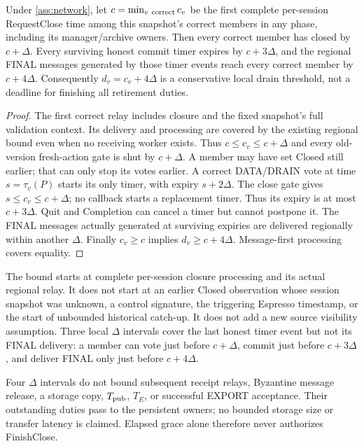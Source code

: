 \begin{proposition}
\label{prop:retirement-drain}
Under \cref{ass:network}, let $c=\min_{v\ {\rm correct}}c_v$ be the first
complete per-session RequestClose time among this snapshot's correct
members in any phase, including its manager/archive owners. Then every correct member has closed by $c+\Delta$.
Every surviving honest commit timer expires by $c+3\Delta$, and the
regional FINAL messages generated by those timer events reach every
correct member by $c+4\Delta$. Consequently $d_v=c_v+4\Delta$ is a
conservative local drain threshold, not a deadline for finishing all
retirement duties.
\end{proposition}
\begin{proof}
The first correct relay includes closure and the fixed snapshot's full
validation context. Its delivery and processing are covered by the
existing regional bound even when no receiving worker exists. Thus
$c\le c_v\le c+\Delta$ and every old-version fresh-action gate is shut
by $c+\Delta$. A member may have set Closed still earlier; that can only
stop its votes earlier. A correct DATA/DRAIN vote at time
$s=\tau_v(P)$ starts its only timer, with expiry $s+2\Delta$.
The close gate gives $s\le c_v\le c+\Delta$; no callback starts a
replacement timer. Thus its expiry is at most $c+3\Delta$.
Quit and Completion can cancel a timer but cannot postpone it.
The FINAL messages actually generated at surviving expiries are
delivered regionally within another $\Delta$. Finally $c_v\ge c$
implies $d_v\ge c+4\Delta$. Message-first processing covers equality.
\end{proof}

The bound starts at complete per-session closure processing and its
actual regional relay. It does not start at an earlier Closed observation
whose session snapshot was unknown, a control signature, the triggering Espresso timestamp, or the
start of unbounded historical catch-up. It does not add a new source
visibility assumption. Three local $\Delta$ intervals cover the last
honest timer event but not its FINAL delivery: a member can vote just
before $c+\Delta$, commit just before $c+3\Delta$, and deliver FINAL
only just before $c+4\Delta$.

Four $\Delta$ intervals do not bound subsequent receipt relays,
Byzantine message release, a storage copy, $T_{\rm pub}$, $T_E$, or
successful EXPORT acceptance. Their outstanding duties pass to the
persistent owners; no bounded storage size or transfer latency is
claimed. Elapsed grace alone therefore never authorizes FinishClose.

